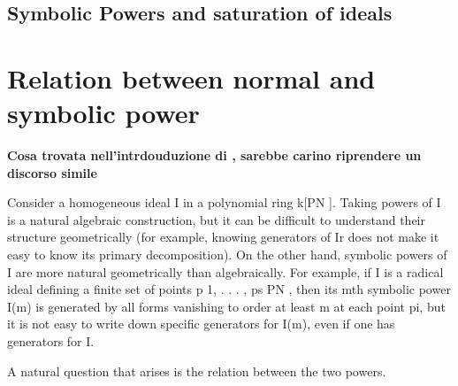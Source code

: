 \documentclass[]{book}
\theoremstyle{plain}
\theoremstyle{remark}
\theoremstyle{definition}
\begin{document}
\subsection{Symbolic Powers and saturation of ideals}


\section{Relation between normal and symbolic power}
\begin{tcolorbox}

\textbf{Cosa trovata nell'intrdouduzione di \cite{BocciHrabourne10} , sarebbe carino riprendere un discorso simile}

Consider a homogeneous ideal I in a polynomial ring k[PN ]. Taking powers of I is a natural algebraic construction, but it can be difficult to understand their structure geometrically (for example, knowing generators of Ir does not make it easy to know its primary decomposition). On the other hand, symbolic powers of I are more natural geometrically than algebraically. For example, if I is a radical ideal defining a finite set of points p 1, . . . , ps  PN , then its mth symbolic power I(m) is generated by all forms vanishing to order at least m at each point pi, but it is not easy to write down specific generators for I(m), even if one has generators for I.

A natural question that arises is the relation between the two powers.
\end{tcolorbox}
\end{document}
